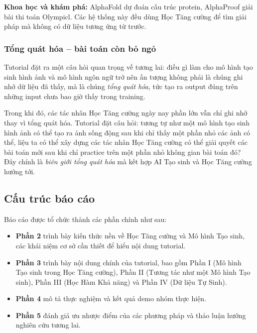 \textbf{Khoa học và khám phá:} AlphaFold dự đoán cấu trúc protein,
AlphaProof giải bài thi toán Olympicl. Các hệ thống này đều dùng Học Tăng cường để tìm giải pháp mà không có dữ liệu tương ứng từ trước.
 
\subsubsection{Tổng quát hóa -- bài toán còn bỏ ngỏ}
 
Tutorial đặt ra một câu hỏi quan trọng về tương lai: điều gì làm cho
mô hình tạo sinh hình ảnh và mô hình ngôn ngữ trở nên ấn tượng không phải
là chúng ghi nhớ dữ liệu đã thấy, mà là chúng \textit{tổng quát hóa}, tức tạo ra output đúng trên những input chưa bao giờ thấy trong training.
 
Trong khi đó, các tác nhân Học Tăng cường ngày nay phần lớn vẫn chỉ ghi nhớ thay vì
tổng quát hóa. Tutorial đặt câu hỏi: tương tự như một mô hình tạo sinh hình ảnh
có thể tạo ra ảnh sống động sau khi chỉ thấy một phần nhỏ các
ảnh có thể, liệu ta có thể xây dựng các tác nhân Học Tăng cường có thể giải quyết các
bài toán mới sau khi chỉ practice trên một phần nhỏ không gian bài
toán đó? Đây chính là \textit{biên giới tổng quát hóa} mà kết hợp
AI Tạo sinh và Học Tăng cường hướng tới.
 
\subsection{Cấu trúc báo cáo}
 
Báo cáo được tổ chức thành các phần chính như sau:
\begin{itemize}
    \item \textbf{Phần 2} trình bày kiến thức nền về Học Tăng cường
    và Mô hình Tạo sinh, các khái niệm cơ sở cần thiết để
    hiểu nội dung tutorial.
    \item \textbf{Phần 3} trình bày nội dung chính của tutorial, bao
    gồm Phần I (Mô hình Tạo sinh trong Học Tăng cường), Phần II (Tương tác như
    một Mô hình Tạo sinh), Phần III (Học Hàm Khả năng) và Phần IV (Dữ liệu
    Tự Sinh).
    \item \textbf{Phần 4} mô tả thực nghiệm và kết quả demo nhóm thực
    hiện.
    \item \textbf{Phần 5} đánh giá ưu nhược điểm của các phương pháp
    và thảo luận hướng nghiên cứu tương lai.
\end{itemize}
 
